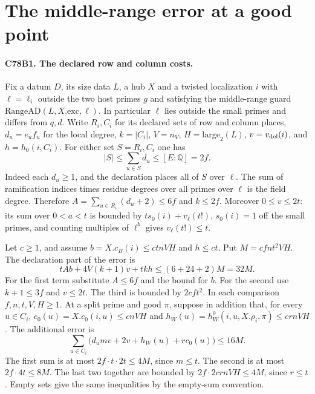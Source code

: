 \section{The middle-range error at a good point}

\paragraph{C78B1. The declared row and column costs.}
Fix a datum $D$, its size data $L$, a hub $X$ and a twisted
localization $i$ with $\ell=\ell_i$ outside the two host primes
$g$ and satisfying the middle-range guard
$\mathrm{RangeAD}(L,X.\mathrm{exc},\ell)$. In particular
$\ell$ lies outside the small primes and differs from $q,d$.
Write $R_i,C_i$ for its declared sets of row and column places,
$d_u=e_uf_u$ for the local degree, $k=|C_i|$, $V=n_V$,
$H=\mathrm{large}_2(L)$, $v=v_{\rm del}(i)$, and
$h=h_0(i,C_i)$. For either set $S=R_i,C_i$ one has
\[
       |S|\le\sum_{u\in S}d_u\le [E:\mathbb Q]=2f .
\]
Indeed each $d_u\ge1$, and the declaration places all of $S$ over
$\ell$. The sum of ramification indices times residue degrees over
all primes over $\ell$ is the field degree. Therefore
$A=\sum_{u\in R_i}(d_u+2)\le 6f$ and $k\le2f$.
Moreover $0\le v\le 2t$: its sum over $0<a<t$ is bounded by
$t s_0(i)+v_\ell(t!)$, $s_0(i)=1$ off the small primes, and counting
multiples of $\ell^b$ gives $v_\ell(t!)\le t$.

Let $c\ge1$, and assume $b=X.c_B(i)\le ctnVH$ and $h\le ct$.
Put $M=cfn t^2VH$. The declaration part of the error is
\[
      t A b + 4V(k+1)v + t k h\le (6+24+2)M=32M .
\]
For the first term substitute $A\le6f$ and the bound for $b$.
For the second use $k+1\le3f$ and $v\le2t$. The third is bounded
by $2cft^2$. In each comparison $f,n,t,V,H\ge1$.
At a split prime and good $\pi$, suppose in addition that, for every
$u\in C_i$, $c_0(u)=X.c_0(i,u)\le cnVH$ and
$h_W(u)=h^0_W(i,u,X.\rho_i,\pi)\le crnVH$. The additional error is
\[
   \sum_{u\in C_i}\bigl(d_u m v +2v+h_W(u)+r c_0(u)\bigr)\le16 M .
\]
The first sum is at most $2f\cdot t\cdot2t\le4M$, since $m\le t$.
The second is at most $2f\cdot4t\le8M$. The last two together are
bounded by $2f\cdot2crnVH\le4M$, since $r\le t$. Empty sets
give the same inequalities by the empty-sum convention.

